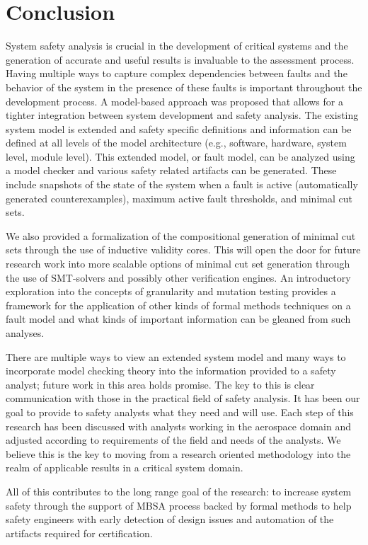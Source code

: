 \chapter{Conclusion}
\label{chap:conclusion}
System safety analysis is crucial in the development of critical systems and the generation of accurate and useful results is invaluable to the assessment process. Having multiple ways to capture complex dependencies between faults and the behavior of the system in the presence of these faults is important throughout the development process. A model-based approach was proposed that allows for a tighter integration between system development and safety analysis. The existing system model is extended and safety specific definitions and information can be defined at all levels of the model architecture (e.g., software, hardware, system level, module level). This extended model, or fault model, can be analyzed using a model checker and various safety related artifacts can be generated. These include snapshots of the state of the system when a fault is active (automatically generated counterexamples), maximum active fault thresholds, and minimal cut sets. 

We also provided a formalization of the compositional generation of minimal cut sets through the use of inductive validity cores. This will open the door for future research work into more scalable options of minimal cut set generation through the use of SMT-solvers and possibly other verification engines. An introductory exploration into the concepts of granularity and mutation testing provides a framework for the application of other kinds of formal methods techniques on a fault model and what kinds of important information can be gleaned from such analyses. 

There are multiple ways to view an extended system model and many ways to incorporate model checking theory into the information provided to a safety analyst; future work in this area holds promise. The key to this is clear communication with those in the practical field of safety analysis. It has been our goal to provide to safety analysts what they need and will use. Each step of this research has been discussed with analysts working in the aerospace domain and adjusted according to requirements of the field and needs of the analysts. We believe this is the key to moving from a research oriented methodology into the realm of applicable results in a critical system domain. 

All of this contributes to the long range goal of the research: to increase system safety through the support of MBSA process backed by formal methods to help safety engineers with early detection of design issues and automation of the artifacts required for certification. 